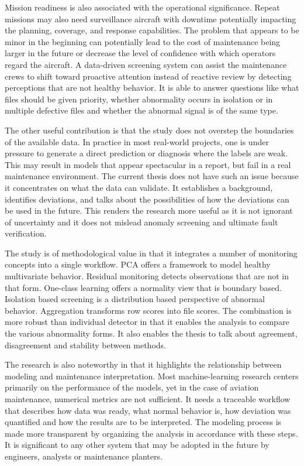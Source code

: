 \documentclass[12pt,a4paper]{report}
\begin{document}
	Mission readiness is also associated with the operational significance. Repeat missions may also need surveillance aircraft with downtime potentially impacting the planning, coverage, and response capabilities. The problem that appears to be minor in the beginning can potentially lead to the cost of maintenance being larger in the future or decrease the level of confidence with which operators regard the aircraft. A data-driven screening system can assist the maintenance crews to shift toward proactive attention instead of reactive review by detecting perceptions that are not healthy behavior. It is able to answer questions like what files should be given priority, whether abnormality occurs in isolation or in multiple defective files and whether the abnormal signal is of the same type.
	
	The other useful contribution is that the study does not overstep the boundaries of the available data. In practice in most real-world projects, one is under pressure to generate a direct prediction or diagnosis where the labels are weak. This may result in models that appear spectacular in a report, but fail in a real maintenance environment. The current thesis does not have such an issue because it concentrates on what the data can validate. It establishes a background, identifies deviations, and talks about the possibilities of how the deviations can be used in the future. This renders the research more useful as it is not ignorant of uncertainty and it does not mislead anomaly screening and ultimate fault verification.
	
	The study is of methodological value in that it integrates a number of monitoring concepts into a single workflow. PCA offers a framework to model healthy multivariate behavior. Residual monitoring detects observations that are not in that form. One-class learning offers a normality view that is boundary based. Isolation based screening is a distribution based perspective of abnormal behavior. Aggregation transforms row scores into file scores. The combination is more robust than individual detector in that it enables the analysis to compare the various abnormality forms. It also enables the thesis to talk about agreement, disagreement and stability between methods.
	
	The research is also noteworthy in that it highlights the relationship between modeling and maintenance interpretation. Most machine-learning research centers primarily on the performance of the models, yet in the case of aviation maintenance, numerical metrics are not sufficient. It needs a traceable workflow that describes how data was ready, what normal behavior is, how deviation was quantified and how the results are to be interpreted. The modeling process is made more transparent by organizing the analysis in accordance with these steps. It is significant to any other system that may be adopted in the future by engineers, analysts or maintenance planters.
	
\end{document}

